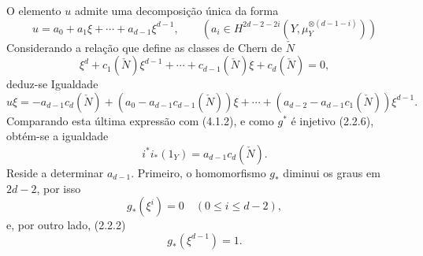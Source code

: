 O elemento $u$ admite uma decomposição única da forma
\[
u=a_0+a_1\xi+\cdots+a_{d-1}\xi^{d-1},
\qquad
(a_i\in H^{2d-2-2i}(Y,\mu_Y^{\otimes(d-1-i)}))
\tag{4.1.3}
\]
Considerando a relação que define as classes de Chern de $\check N$
\[
\xi^d+c_1(\check N)\xi^{d-1}+\cdots+c_{d-1}(\check N)\xi+c_d(\check N)=0,
\tag{4.1.4}
\]
deduz-se Igualdade
\[
u\xi=-a_{d-1}c_d(\check N)+(a_0-a_{d-1}c_{d-1}(\check N))\xi
+\cdots+(a_{d-2}-a_{d-1}c_1(\check N))\xi^{d-1}.
\]
Comparando esta última expressão com (4.1.2), e como $g^*$ é injetivo (2.2.6), obtém-se a igualdade
\[
i^*i_*(1_Y)=a_{d-1}c_d(\check N).
\tag{4.1.5}
\]
Reside a determinar $a_{d-1}$. Primeiro, o homomorfismo $g_*$ diminui os graus em $2d-2$, por isso
\[
g_*(\xi^i)=0\quad(0\le i\le d-2),
\]
e, por outro lado, (2.2.2)
\[
g_*(\xi^{d-1})=1.
\]
